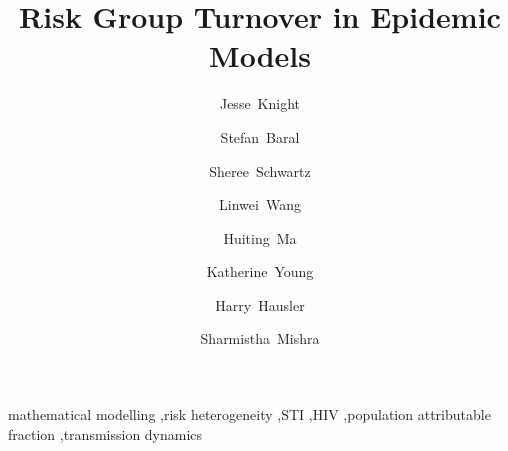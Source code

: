\begin{frontmatter}
\title{Risk Group Turnover in Epidemic Models}
\author[MAP]{Jesse~Knight}
\author[JHU]{Stefan~Baral}  %
\author[JHU]{Sheree~Schwartz}
\author[MAP]{Linwei~Wang}
\author[MAP]{Huiting~Ma}
\author[THC]{Katherine~Young}  %
\author[THC]{Harry~Hausler}      
\author[MAP,IDM,IHP,IMS]{Sharmistha~Mishra}
\address[MAP]{MAP Centre for Urban Health Solutions, Unity Health Toronto}
\address[JHU]{Deptartment of Epidemiology, Johns Hopkins Bloomberg School of Public Health}
\address[THC]{TB HIV Care, South Africa}
\address[IDM]{Department of Medicine, Division of Infectious Disease, University of Toronto}
\address[IHP]{Institute of Health Policy, Management and Evaluation,
  Dalla Lana School of Public Health, University of Toronto}
\address[IMS]{Instituof Medical Sciences, University of Toronto}
\begin{abstract}
  
\end{abstract}
\begin{keyword}
  mathematical modelling \sep risk heterogeneity \sep STI \sep HIV \sep population attributable fraction \sep transmission dynamics %
\end{keyword}
\end{frontmatter}
\clearpage
{}
\setcounter{tocdepth}{2}
\tableofcontents
\clearpage
{}
\setcounter{page}{1}
